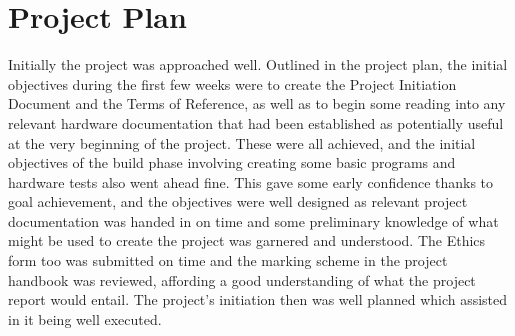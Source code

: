 		\section{Project Plan}
		Initially the project was approached well. Outlined in the project plan, the initial objectives during the first few weeks were to create the Project Initiation Document and the Terms of Reference, as well as to begin some reading into any relevant hardware documentation that had been established as potentially useful at the very beginning of the project. These were all achieved, and the initial objectives of the build phase involving creating some basic programs and hardware tests also went ahead fine. This gave some early confidence thanks to goal achievement, and the objectives were well designed as relevant project documentation was handed in on time and some preliminary knowledge of what might be used to create the project was garnered and understood. The Ethics form too was submitted on time and the marking scheme in the project handbook was reviewed, affording a good understanding of what the project report would entail. The project's initiation then was well planned which assisted in it being well executed.
		

